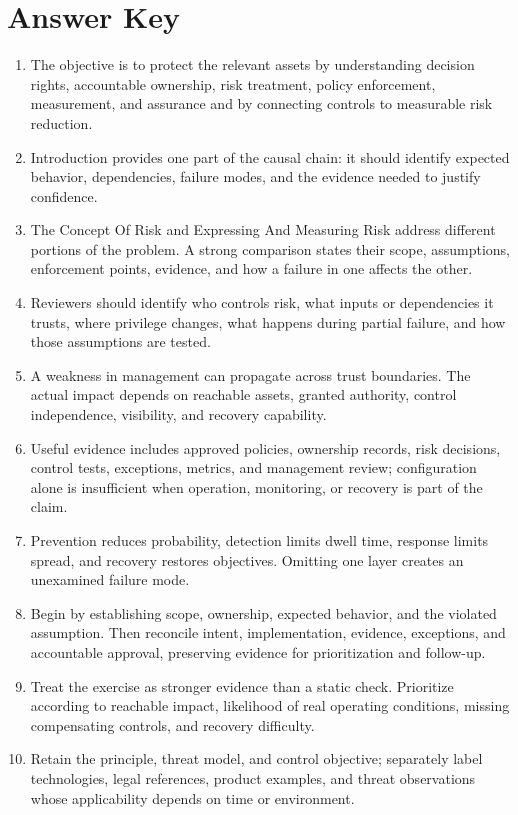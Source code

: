 \documentclass[11pt]{article}
\begin{document}
\section*{Answer Key}
\begin{enumerate}
\item The objective is to protect the relevant assets by understanding decision rights, accountable ownership, risk treatment, policy enforcement, measurement, and assurance and by connecting controls to measurable risk reduction.
\item Introduction provides one part of the causal chain: it should identify expected behavior, dependencies, failure modes, and the evidence needed to justify confidence.
\item The Concept Of Risk and Expressing And Measuring Risk address different portions of the problem. A strong comparison states their scope, assumptions, enforcement points, evidence, and how a failure in one affects the other.
\item Reviewers should identify who controls risk, what inputs or dependencies it trusts, where privilege changes, what happens during partial failure, and how those assumptions are tested.
\item A weakness in management can propagate across trust boundaries. The actual impact depends on reachable assets, granted authority, control independence, visibility, and recovery capability.
\item Useful evidence includes approved policies, ownership records, risk decisions, control tests, exceptions, metrics, and management review; configuration alone is insufficient when operation, monitoring, or recovery is part of the claim.
\item Prevention reduces probability, detection limits dwell time, response limits spread, and recovery restores objectives. Omitting one layer creates an unexamined failure mode.
\item Begin by establishing scope, ownership, expected behavior, and the violated assumption. Then reconcile intent, implementation, evidence, exceptions, and accountable approval, preserving evidence for prioritization and follow-up.
\item Treat the exercise as stronger evidence than a static check. Prioritize according to reachable impact, likelihood of real operating conditions, missing compensating controls, and recovery difficulty.
\item Retain the principle, threat model, and control objective; separately label technologies, legal references, product examples, and threat observations whose applicability depends on time or environment.
\end{enumerate}
\end{document}
